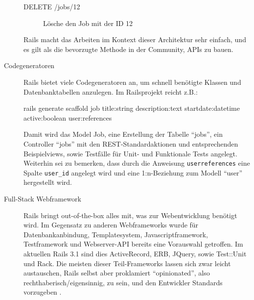 \begin{description}
\begin{description}
  \item[DELETE /jobs/12] Lösche den Job mit der ID 12
  \end{description} 
 Rails macht das Arbeiten im Kontext dieser Architektur sehr einfach, und es gilt als die bevorzugte Methode in der Community, APIs zu bauen. 
 \item[Codegeneratoren] Rails bietet viele Codegeneratoren an, um schnell benötigte Klassen und Datenbanktabellen anzulegen. Im Railsprojekt reicht z.B.:
\begin{ruby}[label=test/test\_feed.rb]
rails generate scaffold job title:string description:text 
  start\PYZus{}date:datetime active:boolean user:references
\end{ruby}
  Damit wird das Model Job, eine Erstellung der Tabelle "`jobs"', ein Controller "`jobs"' mit den REST-Standardaktionen und entsprechenden Beispielviews, sowie Testfälle für Unit- und Funktionale Tests angelegt. Weiterhin sei zu bemerken, dass durch die Anweisung \texttt{user\:references} eine Spalte \texttt{user\_id} angelegt wird und eine 1:n-Beziehung zum Modell "`user"' hergestellt wird.
 \item[Full-Stack Webframework] Rails bringt out-of-the-box alles mit, was zur Webentwicklung benötigt wird. Im Gegensatz zu anderen Webframeworks wurde für Datenbankanbindung, Templatesystem, Javascriptframework, Testframework und Webserver-API bereits eine Vorauswahl getroffen. Im aktuellen Rails 3.1 sind dies ActiveRecord, ERB, JQuery, sowie Test::Unit und Rack. Die meisten dieser Teil-Frameworks lassen sich zwar leicht austauschen, Rails selbst aber proklamiert "`opinionated"', also rechthaberisch/eigensinnig, zu sein, und den Entwickler Standards vorzugeben \citep{david_heinemeier_hansson_railsconf_2011}.
\end{description}

